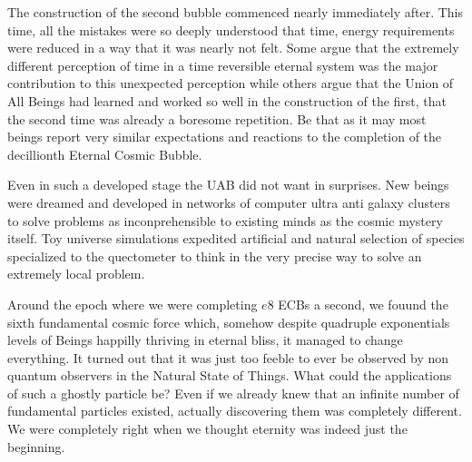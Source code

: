 \documentclass[]{article}
\begin{document}
	
	
	
	
	The construction of the second bubble commenced nearly immediately after. This time, all the mistakes were so deeply understood that time, energy requirements were reduced in a way that it was nearly not felt. Some argue that the extremely different perception of time in a time reversible eternal system was the major contribution to this unexpected perception while others argue that the Union of All Beings had learned and worked so well in the construction of the first, that the second time was already a boresome repetition. Be that as it may most beings report very similar expectations and reactions to the completion of the decillionth Eternal Cosmic Bubble.
	
	Even in such a developed stage the UAB did not want in surprises. New beings were dreamed and developed in networks of computer ultra anti galaxy clusters to solve problems as inconprehensible to existing minds as the cosmic mystery itself. Toy universe simulations expedited artificial and natural selection of species specialized to the quectometer to think in the very precise way to solve an extremely local problem.
	
	Around the epoch where we were completing $e8$ ECBs a second, we fouund the sixth fundamental cosmic force which, somehow despite quadruple exponentials levels of Beings happilly thriving in eternal bliss, it managed to change everything. It turned out that it was just too feeble to ever be observed by non quantum observers in the Natural State of Things. What could the applications of such a ghostly particle be? Even if we already knew that an infinite number of fundamental particles existed, actually discovering them was completely different. We were completely right when we thought eternity was indeed just the beginning.
	
	
	
	
	
\end{document}
